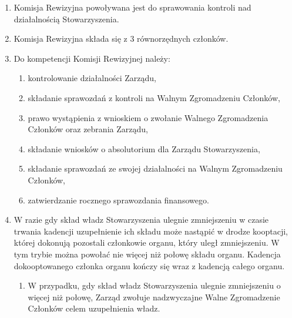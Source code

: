 \documentclass{article}
\begin{document}
\begin{enumerate}
    \item Komisja Rewizyjna powoływana jest do sprawowania kontroli nad działalnością Stowarzyszenia.
    \item Komisja Rewizyjna składa się z 3 równorzędnych członków.
    \item Do kompetencji Komisji Rewizyjnej należy:
      \begin{enumerate}
        \item kontrolowanie działalności Zarządu,
        \item składanie sprawozdań z kontroli na Walnym Zgromadzeniu Członków,
        \item prawo wystąpienia z wnioskiem o zwołanie Walnego Zgromadzenia Członków oraz zebrania Zarządu,
        \item składanie wniosków o absolutorium dla Zarządu Stowarzyszenia,
        \item składanie sprawozdań ze swojej działalności na Walnym Zgromadzeniu Członków,
        \item zatwierdzanie rocznego sprawozdania finansowego.
      \end{enumerate}
    \item W razie gdy skład władz Stowarzyszenia ulegnie zmniejszeniu w czasie trwania kadencji uzupełnienie ich składu może nastąpić w drodze kooptacji, której dokonują pozostali członkowie organu, który uległ zmniejszeniu. W tym trybie można powołać nie więcej niż połowę składu organu. Kadencja dokooptowanego członka organu kończy się wraz z kadencją całego organu.
      \begin{enumerate}
        \item W przypadku, gdy skład władz Stowarzyszenia ulegnie zmniejszeniu o więcej niż połowę, Zarząd zwołuje nadzwyczajne Walne Zgromadzenie Członków celem uzupełnienia władz.
      \end{enumerate}
  \end{enumerate}
\end{document}
